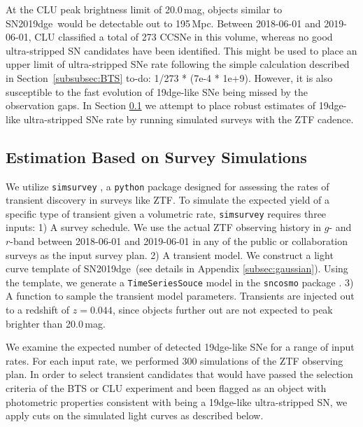 \documentclass[twocolumn]{aastex63}
\newcommand{\name}{SN2019dge}
\newcommand{\todo}[1]{{\color{magenta} to-do: {#1}}}
\begin{document}
\begin{CJK*}{UTF8}{gbsn}
At the CLU peak brightness limit of 20.0\,mag, objects similar to \name\ would be detectable out to 
195\,Mpc. Between 2018-06-01 and 2019-06-01, CLU classified a total of 273 CCSNe in this volume, 
whereas no good ultra-stripped SN candidates have been identified. This might be used to place an 
upper limit of ultra-stripped SNe rate following the simple calculation described in 
Section~\ref{subsubsec:BTS} \todo{1/273 * (7e-4 * 1e+9)}. However, it is also susceptible to the fast 
evolution of 19dge-like SNe 
being missed by the observation gaps. In Section \ref{subsec:cadence} we attempt to place robust 
estimates of 19dge-like ultra-stripped SNe rate by running simulated surveys with the ZTF cadence.

\subsection{Estimation Based on Survey Simulations}\label{subsec:cadence}
We utilize \texttt{simsurvey} \citep{Feindt2019}, a \texttt{python} package designed for 
assessing the rates of transient discovery in surveys like ZTF. To simulate the expected yield of a 
specific type of transient given a volumetric rate, \texttt{simsurvey} requires three inputs: 1) A survey 
schedule. We use the actual ZTF observing history in $g$- and $r$-band between 2018-06-01 and 
2019-06-01 in any of the public or collaboration surveys as the input survey plan. 2) A transient model. 
We construct a light curve template of \name\ (see details in Appendix \ref{subsec:gaussian}). Using 
the template, we generate a \texttt{TimeSeriesSouce} model in the \texttt{sncosmo} package 
\citep{Barbary2016}. 3) A function to sample the transient model parameters. Transients are injected 
out to a redshift of $z=0.044$, since objects further out are not expected to peak brighter than 
20.0\,mag. 

We examine the expected number of detected 19dge-like SNe for a range of input rates. For each input 
rate, we performed 300 simulations of the ZTF observing plan. In order to select transient candidates 
that would have passed the selection criteria of the BTS or CLU experiment and been flagged as an 
object with photometric properties consistent with being a 19dge-like ultra-stripped SN, we apply cuts 
on the simulated light curves as described below.


\end{CJK*}
\end{document}
